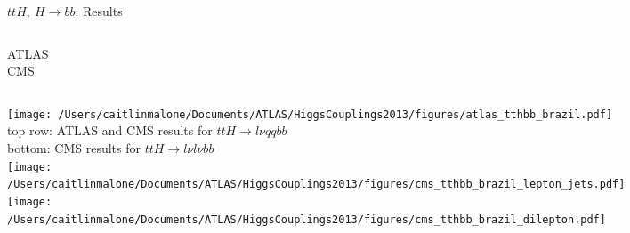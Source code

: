 \documentclass{beamer}
\begin{document}
\begin{frame}{$ttH,\ H\rightarrow bb$: Results}
	\begin{columns}[c]
		ATLAS\\
		CMS
	\end{columns}

	\begin{columns}[c]
			\texttt{[image: /Users/caitlinmalone/Documents/ATLAS/HiggsCouplings2013/figures/atlas\_tthbb\_brazil.pdf]} \\
			\vspace{2.5cm}
					\scriptsize
					top row: ATLAS and CMS results for $ttH\rightarrow l\nu qqbb$\\
					bottom: CMS results for $ttH\rightarrow l\nu l\nu bb$\\
			\texttt{[image: /Users/caitlinmalone/Documents/ATLAS/HiggsCouplings2013/figures/cms\_tthbb\_brazil\_lepton\_jets.pdf]}	\\
			\texttt{[image: /Users/caitlinmalone/Documents/ATLAS/HiggsCouplings2013/figures/cms\_tthbb\_brazil\_dilepton.pdf]}		
	\end{columns}
\end{frame}
\end{document}

